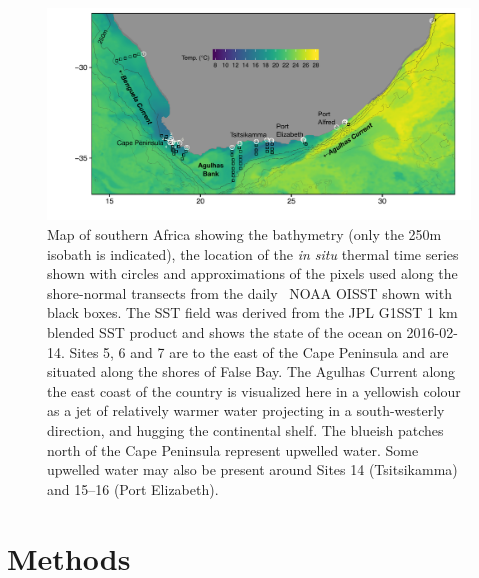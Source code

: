 \documentclass[a4paper,10pt,review]{elsarticle}
\begin{document}
\begin{figure}
\includegraphics[width=1.0\textwidth]{figure1_1km_labeled.pdf}
\caption{Map of southern Africa showing the bathymetry (only the 250m isobath is indicated), the location of the \emph{in situ} thermal time series shown with circles and approximations of the pixels used along the shore-normal transects from the daily \degree~NOAA OISST \cite{Reynolds2007} shown with black boxes. The SST field was derived from the JPL G1SST 1 km blended SST product and shows the state of the ocean on 2016-02-14. Sites 5, 6 and 7 are to the east of the Cape Peninsula and are situated along the shores of False Bay. The Agulhas Current along the east coast of the country is visualized here in a yellowish colour as a jet of relatively warmer water projecting in a south-westerly direction, and hugging the continental shelf. The blueish patches north of the Cape Peninsula represent upwelled water. Some upwelled water may also be present around Sites 14 (Tsitsikamma) and 15--16 (Port Elizabeth).} 
\label{fig:Figure1}
\end{figure}

\section{Methods}
\end{document}
